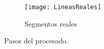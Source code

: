 \begin{figure}
	\begin{subfigure}{.33\linewidth}
	\centering\large \texttt{[image: LineasReales]}
	\caption{Segmentos reales}\label{fig:2.1.13}
	\end{subfigure}%
	
\caption{Pasos del procesado.}\label{fig:2.1}
\end{figure}

